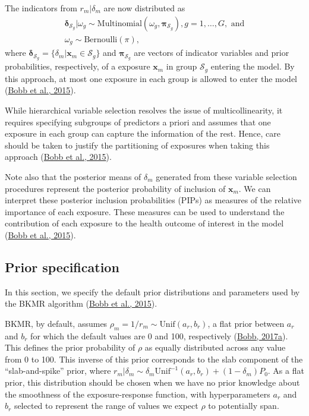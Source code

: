 \documentclass[12pt, twoside]{amherstthesis}
\begin{document}
The indicators from \(r_m|\delta_m\) are now distributed as
\begin{gather*}
\boldsymbol\delta_{\mathcal{S}_g} | \omega_g \sim 
\text{Multinomial}(\omega_g, \boldsymbol\pi_{\mathcal{S}_g}), g=1,\dots,G, \text{ and}\\
\omega_g \sim\text{Bernoulli}(\pi),
\end{gather*}
\noindent where \(\boldsymbol\delta_{\mathcal{S}_g}=\{\delta_m|\textbf{x}_m \in{\mathcal{S}_g}\}\) and \(\boldsymbol\pi_{\mathcal{S}_g}\) are vectors of indicator variables and prior probabilities, respectively, of a exposure \(\textbf{x}_m\) in group \(\mathcal{S}_g\) entering the model. By this approach, at most one exposure in each group is allowed to enter the model (\protect\hyperlink{ref-bobb_bayesian_2015}{Bobb et al., 2015}).

While hierarchical variable selection resolves the issue of multicollinearity, it requires specifying subgroups of predictors a priori and assumes that one exposure in each group can capture the information of the rest. Hence, care should be taken to justify the partitioning of exposures when taking this approach (\protect\hyperlink{ref-bobb_bayesian_2015}{Bobb et al., 2015}).

Note also that the posterior means of \(\delta_m\) generated from these variable selection procedures represent the posterior probability of inclusion of \(\textbf{x}_m\). We can interpret these posterior inclusion probabilities (PIPs) as measures of the relative importance of each exposure. These measures can be used to understand the contribution of each exposure to the health outcome of interest in the model (\protect\hyperlink{ref-bobb_bayesian_2015}{Bobb et al., 2015}).

\hypertarget{bkmrprior}{%
\subsection{Prior specification}\label{bkmrprior}}

In this section, we specify the default prior distributions and parameters used by the BKMR algorithm (\protect\hyperlink{ref-bobb_bayesian_2015}{Bobb et al., 2015}).

BKMR, by default, assumes \(\rho_m=1/r_m \sim \text{Unif}(a_r,b_r)\), a flat prior between \(a_r\) and \(b_r\) for which the default values are 0 and 100, respectively (\protect\hyperlink{ref-bobb_introduction_2017}{Bobb, 2017a}). This defines the prior probability of \(\rho\) as equally distributed across any value from 0 to 100. This inverse of this prior corresponds to the slab component of the ``slab-and-spike'' prior, where \(r_m|\delta_m \sim \delta_m\text{Unif}^{-1}(a_r, b_r) + (1-\delta_m)P_0\). As a flat prior, this distribution should be chosen when we have no prior knowledge about the smoothness of the exposure-response function, with hyperparameters \(a_r\) and \(b_r\) selected to represent the range of values we expect \(\rho\) to potentially span.
\end{document}
